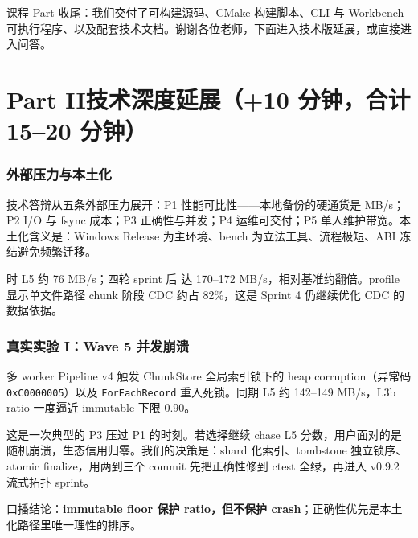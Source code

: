 \documentclass[11pt,a4paper,fontset=none]{ctexart}
\begin{document}
\begin{say}
课程 Part 收尾：我们交付了可构建源码、CMake 构建脚本、CLI 与 Workbench 可执行程序、以及配套技术文档。谢谢各位老师，下面进入技术版延展，或直接进入问答。
\end{say}

\newpage
\part{Part II\quad 技术深度延展（+10 分钟，合计 15--20 分钟）}

\section{外部压力与本土化}
\begin{say}
技术答辩从五条外部压力展开：P1 性能可比性——本地备份的硬通货是 MB/s；P2 I/O 与 fsync 成本；P3 正确性与并发；P4 运维可交付；P5 单人维护带宽。本土化含义是：Windows Release 为主环境、bench 为立法工具、流程极短、ABI 冻结避免频繁迁移。

 时 L5 约 76 MB/s；四轮 sprint 后  达 170--172 MB/s，相对基准约翻倍。profile 显示单文件路径 chunk 阶段 CDC 约占 82\%，这是 Sprint 4 仍继续优化 CDC 的数据依据。
\end{say}


\section{真实实验 I：Wave 5 并发崩溃}
\begin{pressbox}
多 worker Pipeline v4 触发 ChunkStore 全局索引锁下的 heap corruption（异常码 \texttt{0xC0000005}）以及 \texttt{ForEachRecord} 重入死锁。同期 L5 约 142--149 MB/s，L3b ratio 一度逼近 immutable 下限 0.90。
\end{pressbox}
\begin{say}
这是一次典型的 P3 压过 P1 的时刻。若选择继续 chase L5 分数，用户面对的是随机崩溃，生态信用归零。我们的决策是：shard 化索引、tombstone 独立锁序、atomic finalize，用两到三个 commit 先把正确性修到 ctest 全绿，再进入 v0.9.2 流式拓扑 sprint。

口播结论：\textbf{immutable floor 保护 ratio，但不保护 crash}；正确性优先是本土化路径里唯一理性的排序。
\end{say}
\end{document}
